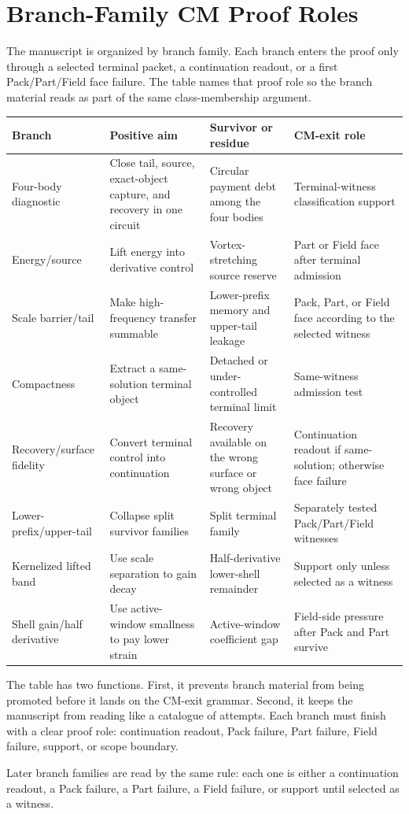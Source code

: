 \section{Branch-Family CM Proof Roles}
\label{sec:branch-status-ledger}

The manuscript is organized by branch family. Each branch enters the
proof only through a selected terminal packet, a continuation readout, or a first
Pack/Part/Field face failure. The table names that proof role so the branch
material reads as part of the same class-membership argument.

\begin{center}
\small
\begin{tabular}{L{0.16\textwidth} L{0.23\textwidth} L{0.23\textwidth} L{0.24\textwidth}}
\hline
\textbf{Branch} & \textbf{Positive aim} & \textbf{Survivor or residue} & \textbf{CM-exit role}\\
\hline
Four-body diagnostic & Close tail, source, exact-object capture, and recovery in one circuit & Circular payment debt among the four bodies & Terminal-witness classification support\\
Energy/source & Lift energy into derivative control & Vortex-stretching source reserve & Part or Field face after terminal admission\\
Scale barrier/tail & Make high-frequency transfer summable & Lower-prefix memory and upper-tail leakage & Pack, Part, or Field face according to the selected witness\\
Compactness & Extract a same-solution terminal object & Detached or under-controlled terminal limit & Same-witness admission test\\
Recovery/surface fidelity & Convert terminal control into continuation & Recovery available on the wrong surface or wrong object & Continuation readout if same-solution; otherwise face failure\\
Lower-prefix/upper-tail & Collapse split survivor families & Split terminal family & Separately tested Pack/Part/Field witnesses\\
Kernelized lifted band & Use scale separation to gain decay & Half-derivative lower-shell remainder & Support only unless selected as a witness\\
Shell gain/half derivative & Use active-window smallness to pay lower strain & Active-window coefficient gap & Field-side pressure after Pack and Part survive\\
\hline
\end{tabular}
\end{center}

The table has two functions. First, it prevents branch material from being
promoted before it lands on the CM-exit grammar. Second, it keeps the manuscript
from reading like a catalogue of attempts. Each branch must finish with a clear
proof role: continuation readout, Pack failure, Part failure, Field failure,
support, or scope boundary.

Later branch families are read by the same rule: each one is either a
continuation readout, a Pack failure, a Part failure, a Field failure, or
support until selected as a witness.
